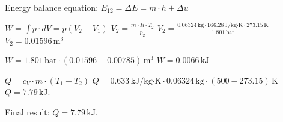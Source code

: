 Energy balance equation:  
\( E_{12} = \Delta E = m \cdot h + \Delta u \)  

\( W = \int p \cdot dV = p(V_2 - V_1) \)  
\( V_2 = \frac{m \cdot R \cdot T_2}{p_2} \)  
\( V_2 = \frac{0.06324 \, \text{kg} \cdot 166.28 \, \text{J/kg·K} \cdot 273.15 \, \text{K}}{1.801 \, \text{bar}} \)  
\( V_2 = 0.01596 \, \text{m}^3 \)  

\( W = 1.801 \, \text{bar} \cdot (0.01596 - 0.00785) \, \text{m}^3 \)  
\( W = 0.0066 \, \text{kJ} \)  

\( Q = c_V \cdot m \cdot (T_1 - T_2) \)  
\( Q = 0.633 \, \text{kJ/kg·K} \cdot 0.06324 \, \text{kg} \cdot (500 - 273.15) \, \text{K} \)  
\( Q = 7.79 \, \text{kJ} \).  

Final result: \( Q = 7.79 \, \text{kJ} \).